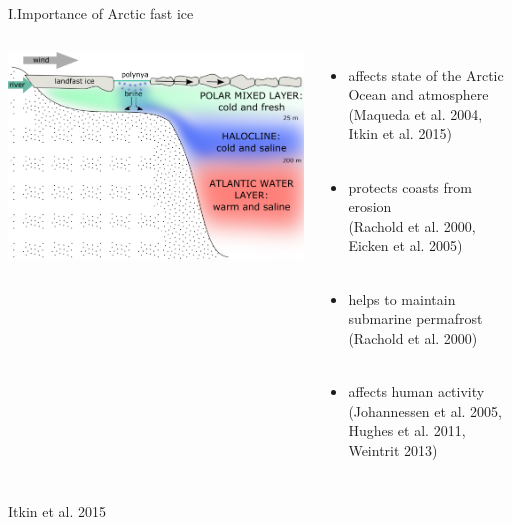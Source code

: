 \documentclass[8pt]{beamer}
\newcommand\Fontvi{\fontsize{6}{7.2}\selectfont}
\begin{document}
\setwatermark{\fontsize{125pt}{125pt}\selectfont{}}
\begin{frame}[fragile]{I.Importance of Arctic fast ice}
	\begin{columns}
			\includegraphics[width=1\textwidth]{./img/ImportanceFI.png}\\
		\begin{itemize}
			\item affects state of the Arctic Ocean and atmosphere\\(Maqueda et al. 2004, Itkin et al. 2015)\\~\\ 
			\item protects coasts from erosion\\(Rachold et al. 2000, Eicken et al. 2005)\\~\\ 
			\item helps to maintain submarine permafrost\\ (Rachold et al. 2000)\\~\\
			\item affects human activity\\(Johannessen et al. 2005, Hughes et al. 2011, Weintrit 2013)
		\end{itemize}
	\end{columns}
\Fontvi
Itkin et al. 2015
\end{frame}
\end{document}
